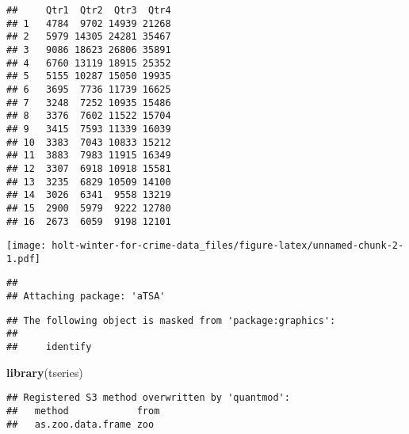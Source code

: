 \documentclass[]{article}
\newenvironment{Shaded}{\begin{snugshade}}{\end{snugshade}}
\newcommand{\CommentTok}[1]{\textcolor[rgb]{0.56,0.35,0.01}{\textit{#1}}}
\newcommand{\DataTypeTok}[1]{\textcolor[rgb]{0.13,0.29,0.53}{#1}}
\newcommand{\KeywordTok}[1]{\textcolor[rgb]{0.13,0.29,0.53}{\textbf{#1}}}
\newcommand{\NormalTok}[1]{#1}
\newcommand{\OperatorTok}[1]{\textcolor[rgb]{0.81,0.36,0.00}{\textbf{#1}}}
\newcommand{\StringTok}[1]{\textcolor[rgb]{0.31,0.60,0.02}{#1}}
\begin{document}
\begin{verbatim}
##     Qtr1  Qtr2  Qtr3  Qtr4
## 1   4784  9702 14939 21268
## 2   5979 14305 24281 35467
## 3   9086 18623 26806 35891
## 4   6760 13119 18915 25352
## 5   5155 10287 15050 19935
## 6   3695  7736 11739 16625
## 7   3248  7252 10935 15486
## 8   3376  7602 11522 15704
## 9   3415  7593 11339 16039
## 10  3383  7043 10833 15212
## 11  3883  7983 11915 16349
## 12  3307  6918 10918 15581
## 13  3235  6829 10509 14100
## 14  3026  6341  9558 13219
## 15  2900  5979  9222 12780
## 16  2673  6059  9198 12101
\end{verbatim}

\begin{Shaded}
\end{Shaded}

\texttt{[image: holt-winter-for-crime-data\_files/figure-latex/unnamed-chunk-2-1.pdf]}

\begin{Shaded}
\end{Shaded}

\begin{verbatim}
## 
## Attaching package: 'aTSA'
\end{verbatim}

\begin{verbatim}
## The following object is masked from 'package:graphics':
## 
##     identify
\end{verbatim}

\begin{Shaded}
\begin{Highlighting}[]
\KeywordTok{library}\NormalTok{(tseries)}
\end{Highlighting}
\end{Shaded}

\begin{verbatim}
## Registered S3 method overwritten by 'quantmod':
##   method            from
##   as.zoo.data.frame zoo
\end{verbatim}
\end{document}
